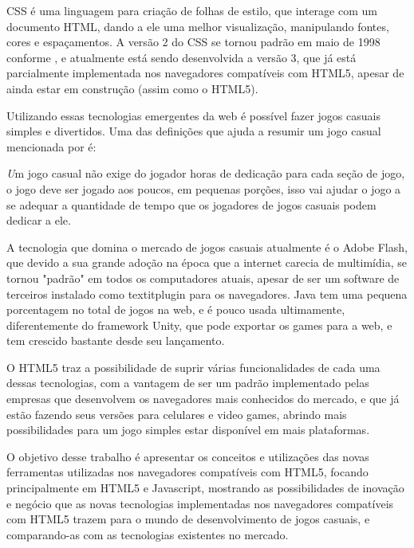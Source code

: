 CSS é uma linguagem para criação de folhas de estilo, que interage com um documento
HTML, dando a ele uma melhor visualização, manipulando fontes, cores e espaçamentos.
A versão 2 do CSS se tornou padrão em maio de 1998 conforme
,
e atualmente está sendo desenvolvida a versão 3, que já está parcialmente implementada
nos navegadores compatíveis com HTML5, apesar de ainda estar em construção (assim como o HTML5).

Utilizando essas tecnologias emergentes da web é possível fazer jogos casuais simples
e divertidos. Uma das definições que ajuda a resumir um jogo casual
mencionada por  é:

\begin{singlespacing}
\begin{citacao}{4cm}{0cm}\footnotesize \emph
      Um jogo casual não exige do jogador horas de
      dedicação para cada seção de jogo, o jogo deve ser jogado aos poucos, em pequenas
      porções, isso vai ajudar o jogo a se adequar a quantidade de tempo que os jogadores
      de jogos casuais podem dedicar a ele.
\end{citacao}
\end{singlespacing}

A tecnologia que domina o mercado de jogos casuais atualmente é o Adobe Flash, que devido
a sua grande adoção na época que a internet carecia de multimídia, se tornou "padrão"
em todos os computadores atuais, apesar de ser um software de terceiros instalado
como textit{plugin} para os navegadores. Java tem uma pequena porcentagem no total de jogos
na web, e é pouco usada ultimamente, diferentemente do framework Unity, que pode exportar
os games para a web, e tem crescido bastante desde seu lançamento.

O HTML5 traz a possibilidade de suprir várias funcionalidades de cada uma dessas tecnologias,
com a vantagem de ser um padrão implementado pelas empresas que desenvolvem os navegadores
mais conhecidos do mercado, e que já estão fazendo seus versões para celulares e
video games, abrindo mais possibilidades para um jogo simples estar disponível em mais plataformas.

O objetivo desse trabalho é apresentar os conceitos e utilizações das novas ferramentas utilizadas
nos navegadores compatíveis com HTML5, focando principalmente em HTML5
e Javascript, mostrando as possibilidades de inovação e negócio que as novas tecnologias implementadas
nos navegadores compatíveis com HTML5 trazem para o mundo de
desenvolvimento de jogos casuais, e comparando-as com as tecnologias existentes no mercado.


